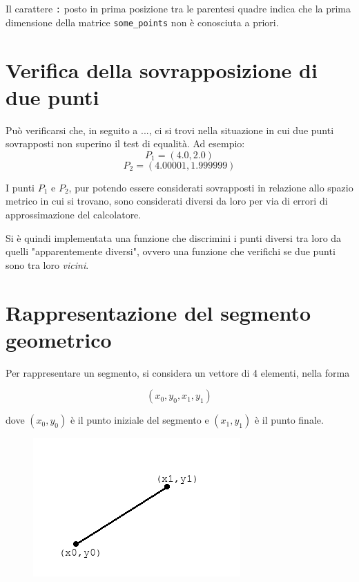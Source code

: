 \documentclass[11pt,a4paper]{report}
\newcommand{\modelicaclass}[1]{
	
}
\begin{document}
Il carattere \verb|:| posto in prima posizione tra le parentesi quadre indica che la prima dimensione della matrice \verb|some_points| non è conosciuta a priori.

\section{Verifica della sovrapposizione di due punti}

Può verificarsi che, in seguito a ..., ci si trovi nella situazione in cui due punti sovrapposti non superino il test di equalità. Ad esempio:
\[
P_1 = (4.0, 2.0)
\]
\[
P_2 = (4.00001, 1.999999)
\]

I punti $P_1$ e $P_2$, pur potendo essere considerati sovrapposti in relazione allo spazio metrico in cui si trovano, sono considerati diversi da loro per via di errori di approssimazione del calcolatore.


Si è quindi implementata una funzione che discrimini i punti diversi tra loro da quelli "apparentemente diversi", ovvero una funzione che verifichi se due punti sono tra loro \textit{vicini}.

\begin{figure}[H]
\modelicaclass{PointsAreClose.mo}
\end{figure}

\section{Rappresentazione del segmento geometrico}

Per rappresentare un segmento, si considera un vettore di 4 elementi, nella forma

\[
(x_0, y_0, x_1, y_1)
\]

dove $(x_0, y_0)$ è il punto iniziale del segmento e $(x_1, y_1)$ è il punto finale.

\begin{figure}[H]
\centering
\includegraphics[scale=0.5]{segmento.png}
\end{figure}
\end{document}
